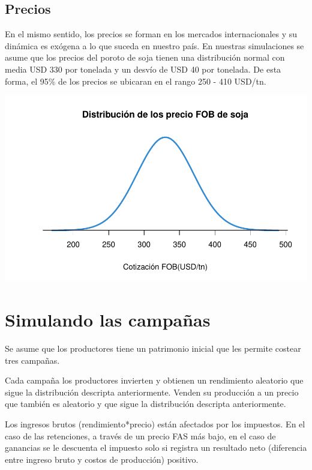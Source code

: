 \documentclass[
  12pt,
  spanish,
  10pt]{article}
\begin{document}
\hypertarget{precios}{%
\subsection{Precios}\label{precios}}

En el mismo sentido, los precios se forman en los mercados
internacionales y su dinámica es exógena a lo que suceda en nuestro
país. En nuestras simulaciones se asume que los precios del poroto de
soja tienen una distribución normal con media USD 330 por tonelada y un
desvío de USD 40 por tonelada. De esta forma, el 95\% de los precios se
ubicaran en el rango 250 - 410 USD/tn.

\begin{center}\includegraphics{simulacion_retenciones_files/figure-latex/unnamed-chunk-4-1} \end{center}

\hypertarget{simulando-las-campauxf1as}{%
\section{Simulando las campañas}\label{simulando-las-campauxf1as}}

Se asume que los productores tiene un patrimonio inicial que les permite
costear tres campañas.

Cada campaña los productores invierten y obtienen un rendimiento
aleatorio que sigue la distribución descripta anteriormente. Venden su
producción a un precio que también es aleatorio y que sigue la
distribución descripta anteriormente.

Los ingresos brutos (rendimiento*precio) están afectados por los
impuestos. En el caso de las retenciones, a través de un precio FAS más
bajo, en el caso de ganancias se le descuenta el impuesto solo si
registra un resultado neto (diferencia entre ingreso bruto y costos de
producción) positivo.
\end{document}
